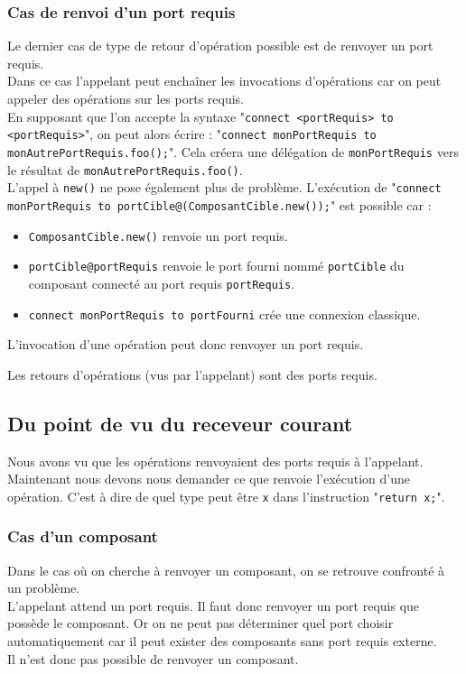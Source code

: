 \documentclass[11pt,a4paper,openany,oneside]{book}
\begin{document}
\subsubsection{Cas de renvoi d'un port requis}
Le dernier cas de type de retour d'opération possible est de renvoyer un port requis.\\
Dans ce cas l'appelant peut enchaîner les invocations d'opérations car on peut appeler des opérations sur les ports requis.\\
En supposant que l'on accepte la syntaxe "\texttt{connect <portRequis> to <portRequis>}", on peut alors écrire : "\texttt{connect monPortRequis to monAutrePortRequis.foo();}". Cela créera une délégation de \texttt{monPortRequis} vers le résultat de  \texttt{monAutrePortRequis.foo()}.\\
L'appel à \texttt{new()} ne pose également plus de problème. L'exécution de "\texttt{connect monPortRequis to portCible@(ComposantCible.new());}" est possible car : 
\begin{itemize}
\item \texttt{ComposantCible.new()} renvoie un port requis.
\item \texttt{portCible@portRequis} renvoie le port fourni nommé \texttt{portCible} du composant connecté au port requis \texttt{portRequis}.
\item \texttt{connect monPortRequis to portFourni} crée une connexion classique.
\end{itemize}
L'invocation d'une opération peut donc renvoyer un port requis.

Les retours d'opérations (vus par l'appelant) sont des ports requis.



\subsection{Du point de vu du receveur courant}
Nous avons vu que les opérations renvoyaient des ports requis à l'appelant. Maintenant nous devons nous demander ce que renvoie l'exécution d'une opération. C'est à dire de quel type peut être \texttt{x} dans l'instruction "\texttt{return x;}".

\subsubsection{Cas d'un composant}
Dans le cas où on cherche à renvoyer un composant, on se retrouve confronté à un problème.\\
L'appelant attend un port requis. Il faut donc renvoyer un port requis que possède le composant. Or on ne peut pas déterminer quel port choisir automatiquement car il peut exister des composants sans port requis externe.\\
Il n'est donc pas possible de renvoyer un composant.
\end{document}
